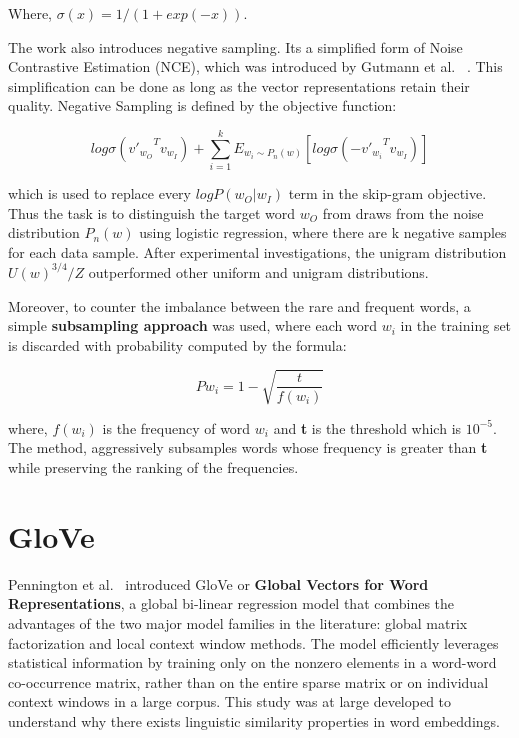 Where, $\sigma(x) = 1/ (1 + exp(-x)).$
\newline

The work also introduces negative sampling. Its a simplified form of Noise Contrastive Estimation (NCE), which was introduced by Gutmann et al. ~\parencite{gutmann}. This simplification can be done as long as the vector representations retain their quality. Negative Sampling is defined by the objective function:

\begin{equation}
log  \sigma ({{v'}_{{w}_{O}}}^{T} {v}_{{w}_{I}}) +  \sum_{i=1}^{k} {E}_{{w}_{i}  \sim {P}_{n}(w)} [log \sigma ({{-v'}_{{w}_{i}}}^{T} {v}_{{w}_{I}})]
\end{equation}

which is used to replace every $log P({w}_{O}| {w}_{I})$ term in the skip-gram objective. Thus the task is to distinguish the target word ${w}_{O}$ from draws from the noise distribution ${P}_{n}(w)$ using logistic regression, where there are k negative samples for each data sample. After experimental investigations, the unigram distribution $U{(w)}^{3/4}/Z$ outperformed other uniform and unigram distributions.
\newline

Moreover, to counter the imbalance between the rare and frequent words, a simple \textbf{subsampling approach} was used, where each word ${w}_{i}$ in the training set is discarded with probability computed by the formula:

\begin{equation}
P{w}_{i} = 1 -  \sqrt{\frac{t}{f({w}_{i})}}
\end{equation}

where, $f({w}_{i})$ is the frequency of word ${w}_{i}$ and \textbf{ t } is the threshold which is ${10}^{-5}$. The method, aggressively subsamples words whose frequency is greater than \textbf{ t} while preserving the ranking of the frequencies. 

\section{GloVe}
Pennington et al.~\parencite{glove} introduced GloVe or \textbf{Global Vectors for Word Representations}, a global bi-linear regression model that combines the advantages of the two major model families in the literature: global matrix factorization and local context window methods. The model efficiently leverages statistical information by training only on the nonzero elements in a word-word co-occurrence matrix, rather than on the entire sparse matrix or on individual context windows in a large corpus. This study was at large developed to understand why there exists linguistic similarity properties in word embeddings.

